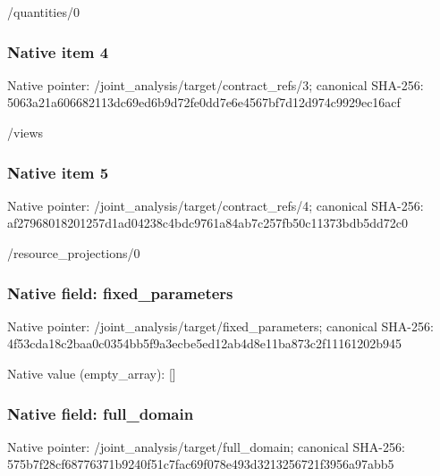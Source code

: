 \documentclass[10pt,a4paper]{article}
\begin{document}
\begingroup\raggedright\sloppy /\allowbreak{}quantities/\allowbreak{}0\par\endgroup

\subsubsection{Native item 4}
Native pointer: /joint\_\allowbreak{}analysis/target/contract\_\allowbreak{}refs/3; canonical SHA-256: 5063a21a606682113dc69ed6b9d72fe0dd7e6e4567bf7d12d974c9929ec16acf

\begingroup\raggedright\sloppy /\allowbreak{}views\par\endgroup

\subsubsection{Native item 5}
Native pointer: /joint\_\allowbreak{}analysis/target/contract\_\allowbreak{}refs/4; canonical SHA-256: af27968018201257d1ad04238c4bdc9761a84ab7c257fb50c11373bdb5dd72c0

\begingroup\raggedright\sloppy /\allowbreak{}resource\_\allowbreak{}projections/\allowbreak{}0\par\endgroup

\subsubsection{Native field: fixed\_\allowbreak{}parameters}
Native pointer: /joint\_\allowbreak{}analysis/target/fixed\_\allowbreak{}parameters; canonical SHA-256: 4f53cda18c2baa0c0354bb5f9a3ecbe5ed12ab4d8e11ba873c2f11161202b945

Native value (empty\_\allowbreak{}array): []

\subsubsection{Native field: full\_\allowbreak{}domain}
Native pointer: /joint\_\allowbreak{}analysis/target/full\_\allowbreak{}domain; canonical SHA-256: 575b7f28cf68776371b9240f51c7fac69f078e493d3213256721f3956a97abb5
\end{document}
